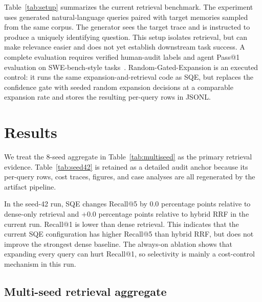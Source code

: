 \documentclass[10pt,twocolumn]{article}
\begin{document}
Table~\ref{tab:setup} summarizes the current retrieval benchmark. The
experiment uses generated natural-language queries paired with target memories
sampled from the same corpus. The generator sees the target trace and is
instructed to produce a uniquely identifying question. This setup isolates
retrieval, but can make relevance easier and does not yet establish
downstream task success. A complete evaluation requires verified human-audit
labels and agent Pass@1 evaluation on SWE-bench-style tasks~\cite{jimenez2024swebench}.
Random-Gated-Expansion is an executed control: it runs the same
expansion-and-retrieval code as SQE, but replaces the confidence gate with seeded
random expansion decisions at a comparable expansion rate and stores the
resulting per-query rows in JSONL.

\section{Results}
We treat the 8-seed aggregate in Table~\ref{tab:multiseed} as the primary
retrieval evidence. Table~\ref{tab:seed42} is retained as a detailed audit
anchor because its per-query rows, cost traces, figures, and case analyses are
all regenerated by the artifact pipeline.

\begin{table}[!tbp]
\caption{Seed-42 retrieval results used as the detailed audit anchor.}
\label{tab:seed42}
\centering
\scriptsize

\end{table}

In the seed-42 run, SQE changes Recall@5 by 0.0 percentage points relative to dense-only
retrieval and +0.0 percentage points relative to hybrid RRF
in the current run. Recall@1 is lower than dense retrieval. This indicates that
the current SQE configuration has higher Recall@5 than hybrid RRF,
but does not improve the strongest dense baseline. The always-on ablation shows
that expanding every query can hurt Recall@1, so selectivity is mainly a
cost-control mechanism in this run.

\subsection{Multi-seed retrieval aggregate}
\begin{table}[!tbp]
\caption{Aggregate retrieval results over independent memory-index seeds.}
\label{tab:multiseed}
\centering
\scriptsize

\end{table}
\end{document}
